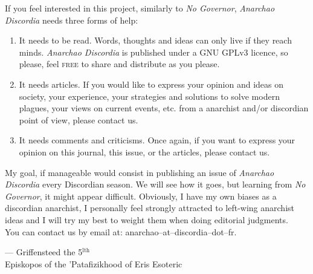 \documentclass[12pt, onecolumn, letterpaper, oneside]{book}
\begin{document}
If you feel interested in this project, similarly to \emph{No Governor}, \emph{Anarchao Discordia} needs three forms of help:
\begin{enumerate}
\item It needs to be read. Words, thoughts and ideas can only live if they reach minds. \emph{Anarchao Discordia} is published under a GNU GPLv3 licence, so please, feel \textsc{free} to share and distribute as you please.
\item It needs articles. If you would like to express your opinion and ideas on society, your experience, your strategies and solutions to solve modern plagues, your views on current events, etc. from a anarchist and/or discordian point of view, please contact us.
\item It needs comments and criticisms. Once again, if you want to express your opinion on this journal, this issue, or the articles, please contact us.
\end{enumerate}

My goal, if manageable would consist in publishing an issue of \emph{Anarchao Discordia} every Discordian season. We will see how it goes, but learning from \emph{No Governor}, it might appear difficult. Obviously, I have my own biases as a discordian anarchist, I personally feel strongly attracted to left-wing anarchist ideas and I will try my best to weight them when doing editorial judgments.\\

You can contact us by email at: anarchao--at--discordia--dot--fr.

\par\begin{flushright} --- Griffensteed the 5$^\text{lth}$\\ Episkopos of the 'Patafizikhood of Eris Esoteric\end{flushright}










\end{document}
